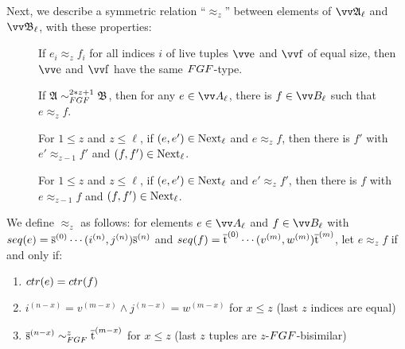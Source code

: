Next, we describe a symmetric relation ``$\approx_{z}$'' between elements of $\unravel{A}_{\ell}$ and $\unravel{B}_{\ell}$, with these properties:
\begin{description}
  \item[] If $e_{i} \approx_{z} f_{i}$ for all indices $i$ of live tuples $\elemtuptuplee$ and $\elemtuptuplef$ of equal size, then $\elemtuptuplee$ and $\elemtuptuplef$ have the same $\FGF$-type.
  \item[] If $\str{A} \bisimto_{\FGF}^{2*z + 1} \str{B}$, then for any $e \in \unraveldom{A}_{\ell}$, there is $f \in \unraveldom{B}_{\ell}$ such that $e \approx_{z} f$.
  \item[] For $1 \le z$ and $z \le \ell$, if $(e, e') \in \mathrm{Next}_{\ell}$ and $e \approx_{z} f$, then there is $f'$ with $e' \approx_{z-1} f'$ and $(f, f') \in \mathrm{Next}_{\ell}$.
  \item[] For $1 \le z$ and $z \le \ell$, if $(e, e') \in \mathrm{Next}_{\ell}$ and $e' \approx_{z} f'$, then there is $f$ with $e \approx_{z-1} f$ and $(f, f') \in \mathrm{Next}_{\ell}$.
\end{description}
We define $\approx_{z}$ as follows: for elements $e \in \unraveldom{A}_{\ell}$ and $f \in \unraveldom{B}_{\ell}$ with $\seq{e} = \elemtuples^{(0)}\cdots(i^{(n)}, j^{(n)})\elemtuples^{(n)}$ and $\seq{f} = \elemtuplet^{(0)}\cdots(v^{(m)}, w^{(m)})\elemtuplet^{(m)}$, let $e \approx_{z} f$ if and only if:
\begin{enumerate}
  \item $\ctr{e} = \ctr{f}$
  \item $i^{(n-x)} = v^{(m-x)} \wedge j^{(n-x)} = w^{(m-x)}$ for $x \le z$ (last $z$ indices are equal)
  \item $\elemtuples^{(n-x)} \bisimto_{\FGF}^{z} \elemtuplet^{(m-x)}$ for $x \le z$ (last $z$ tuples are $z$-$\FGF$-bisimilar)
\end{enumerate}
